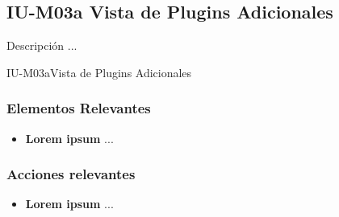 
\subsection{IU-M03a Vista de Plugins Adicionales}

 Descripción ...

        {IU-M03a}{Vista de Plugins Adicionales}

\subsubsection{Elementos Relevantes}

    \begin{itemize}
    \item {\bf Lorem ipsum}
        ...
    \end{itemize}

\subsubsection{Acciones relevantes}

    \begin{itemize}
    \item {\bf Lorem ipsum}
        ...
    \end{itemize}

\clearpage
